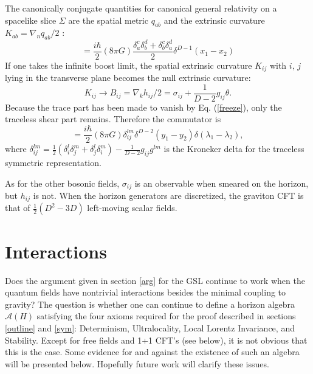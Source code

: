 \documentclass{article}
\begin{document}
The canonically conjugate quantities for canonical general relativity on a spacelike slice $\Sigma$ are the spatial metric $q_{ab}$ and the extrinsic curvature
$K_{ab} = \nabla_{n} q_{ab}/2$ \cite{ADM}:
\begin{equation}
[q_{ab}(x_1),\,(K^{cd} - q^{cd} K)(x_2)] = \frac{i\hbar}{2} (8\pi G) \frac{\delta_a^c\delta_b^d + \delta_b^c\delta_a^d}{2} \delta^{D-1}(x_1 - x_2)
\end{equation}
If one takes the infinite boost limit, the spatial extrinsic curvature $K_{ij}$ with $i,\,j$ lying in the transverse plane becomes the null extrinsic curvature:
\begin{equation}
K_{ij} \to B_{ij} = \nabla_k h_{ij}/2 = \sigma_{ij} + \frac{1}{D-2} g_{ij} \theta.
\end{equation}
Because the trace part has been made to vanish by Eq. (\ref{freeze}), only the traceless shear part remains.  Therefore the commutator is
\begin{equation}
[h_{ij}(y_1,\,\lambda_1),\, \sigma^{lm}(y_2,\,\lambda_2)] = \frac{i\hbar}{2} (8 \pi G)
\delta_{ij}^{lm} \delta^{D-2}(y_1 - y_2) \delta(\lambda_1 - \lambda_2),
\end{equation}
where $\delta^{lm}_{ij} = \frac{1}{2}(\delta^l_i \delta^m_j + \delta^l_j \delta^m_i)
- \frac{1}{D-2} g_{ij}g^{lm}$ is the Kroneker delta for the traceless symmetric representation.

As for the other bosonic fields, $\sigma_{ij}$ is an observable when smeared on the horizon, but $h_{ij}$ is not.  When the horizon generators are discretized, the graviton CFT is that of $\frac{1}{2}(D^2 - 3D)$ left-moving scalar fields.

\section{Interactions}\label{int}

Does the argument given in section \ref{arg} for the GSL continue to work when the quantum fields have nontrivial interactions besides the minimal coupling to gravity?  The question is whether one can continue to define a horizon algebra $\mathcal{A}(H)$ satisfying the four axioms required for the proof described in sections \ref{outline} and \ref{sym}: Determinism, Ultralocality, Local Lorentz Invariance, and Stability.  Except for free fields and 1+1 CFT's (see below), it is not obvious that this is the case.  Some evidence for and against the existence of such an algebra will be presented below.  Hopefully future work will clarify these issues.
\end{document}

